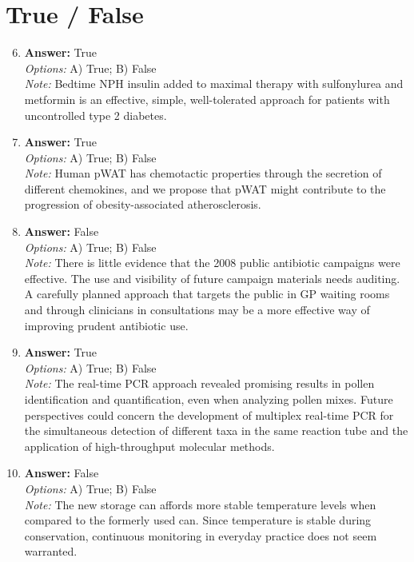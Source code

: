 \documentclass[12pt]{article}
\begin{document}
\section*{True / False}
\begin{enumerate}[label=\arabic*.]
\setcounter{enumi}{5}
\item \textbf{Answer:} True
\\ \textit{Options:} A) True; B) False
\\ \textit{Note:} Bedtime NPH insulin added to maximal therapy with sulfonylurea and metformin is an effective, simple, well-tolerated approach for patients with uncontrolled type 2 diabetes.
\item \textbf{Answer:} True
\\ \textit{Options:} A) True; B) False
\\ \textit{Note:} Human pWAT has chemotactic properties through the secretion of different chemokines, and we propose that pWAT might contribute to the progression of obesity-associated atherosclerosis.
\item \textbf{Answer:} False
\\ \textit{Options:} A) True; B) False
\\ \textit{Note:} There is little evidence that the 2008 public antibiotic campaigns were effective. The use and visibility of future campaign materials needs auditing. A carefully planned approach that targets the public in GP waiting rooms and through clinicians in consultations may be a more effective way of improving prudent antibiotic use.
\item \textbf{Answer:} True
\\ \textit{Options:} A) True; B) False
\\ \textit{Note:} The real-time PCR approach revealed promising results in pollen identification and quantification, even when analyzing pollen mixes. Future perspectives could concern the development of multiplex real-time PCR for the simultaneous detection of different taxa in the same reaction tube and the application of high-throughput molecular methods.
\item \textbf{Answer:} False
\\ \textit{Options:} A) True; B) False
\\ \textit{Note:} The new storage can affords more stable temperature levels when compared to the formerly used can. Since temperature is stable during conservation, continuous monitoring in everyday practice does not seem warranted.
\end{enumerate}
\end{document}
